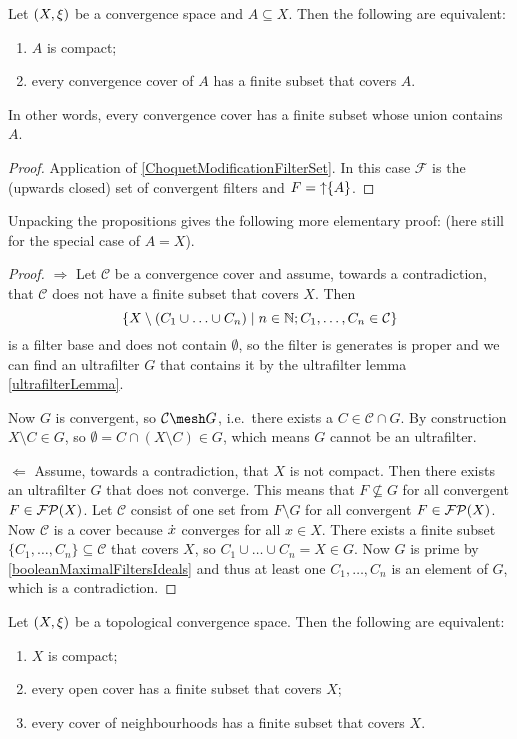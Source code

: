 \begin{proposition} \label{compactFiniteSubcover}
Let $\sSet{X,\xi}$ be a convergence space and $A\subseteq X$. Then the following are equivalent:
\begin{enumerate}
\item $A$ is compact;
\item every convergence cover of $A$ has a finite subset that covers $A$.
\end{enumerate}
\end{proposition}
In other words, every convergence cover has a finite subset whose union contains $A$.
\begin{proof}
Application of \ref{ChoquetModificationFilterSet}. In this case $\mathcal{F}$ is the (upwards closed) set of convergent filters and $F = \operatorname{\uparrow}\{A\}$.
\end{proof}
Unpacking the propositions gives the following more elementary proof: (here still for the special case of $A = X$).
\begin{proof}
$\boxed{\Rightarrow}$ Let $\mathcal{C}$ be a convergence cover and assume, towards a contradiction, that $\mathcal{C}$ does not have a finite subset that covers $X$. Then
\[ \setbuilder{X\setminus(C_1\cup \ldots \cup C_n)}{n\in \N; C_1,\ldots, C_n \in \mathcal{C}} \]
is a filter base and does not contain $\emptyset$, so the filter is generates is proper and we can find an ultrafilter $G$ that contains it by the ultrafilter lemma \ref{ultrafilterLemma}.

Now $G$ is convergent, so $\mathcal{C}\mesh G$, i.e.\ there exists a $C\in \mathcal{C}\cap G$. By construction $X\setminus C\in G$, so $\emptyset = C\cap (X\setminus C)\in G$, which means $G$ cannot be an ultrafilter.

$\boxed{\Leftarrow}$ Assume, towards a contradiction, that $X$ is not compact. Then there exists an ultrafilter $G$ that does not converge. This means that $F \not\subseteq G$ for all convergent $F\in\operatorname{\mathcal{FP}}(X)$. Let $\mathcal{C}$ consist of one set from $F\setminus G$ for all convergent $F\in\operatorname{\mathcal{FP}}(X)$. Now $\mathcal{C}$ is a cover because $\dot{x}$ converges for all $x\in X$. There exists a finite subset $\{C_1, \ldots, C_n\}\subseteq \mathcal{C}$ that covers $X$, so $C_1\cup \ldots \cup C_n = X \in G$. Now $G$ is prime by \ref{booleanMaximalFiltersIdeals} and thus at least one $C_1, \ldots, C_n$ is an element of $G$, which is a contradiction.
\end{proof}
\begin{corollary} \label{topologyCompactnessOpenCover}
Let $\sSet{X,\xi}$ be a topological convergence space. Then the following are equivalent:
\begin{enumerate}
\item $X$ is compact;
\item every open cover has a finite subset that covers $X$;
\item every cover of neighbourhoods has a finite subset that covers $X$.
\end{enumerate}
\end{corollary}
